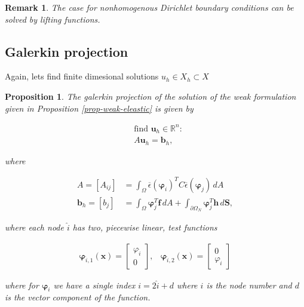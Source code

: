 \documentclass[a4paper,english]{elsarticle}%
\newtheorem{proposition}[theorem]{Proposition}
\newtheorem*{remark}{Remark}
\begin{document}
\begin{remark}
    The case for nonhomogenous Dirichlet boundary conditions can be solved by lifting functions.
\end{remark}
\subsection{Galerkin projection}
Again, lets find finite dimesional solutions $ u_h \in X_h \subset X$

\begin{proposition}
    The galerkin projection of the solution of the weak formulation given in Proposition \ref{prop-weak-eleastic} is given by

        \begin{align}
        &\text{find } \bm u_h \in \mathbb{R}^n : \\
        & A \bm u_h = \bm b_h,
        \end{align}


    where 


        \begin{align}
        A = [A_{ij}] &= \int_\Omega \overline\epsilon (\bm \varphi_i)^T C \overline \epsilon (\bm \varphi_j) \, dA \\
        \bm b_h = [b_j] &= \int_\Omega \bm \varphi_j^T \bm f \, dA + \int_{\partial \Omega_N} \bm \varphi_j^T \bm h \, d\bm S,
        \end{align}


    where each node $\hat i$ has two, piecewise linear, test functions
    
 
        \begin{align}
        \bm \varphi_{\hat i,1} (\bm x) = 
         \begin{bmatrix}
            \varphi_{\hat i}  \\
            0 
        \end{bmatrix},
        &
        \bm \varphi_{\hat i,2} (\bm x) = 
        \begin{bmatrix}
            0  \\
            \varphi_{\hat i} 
        \end{bmatrix} 
    \end{align}

    where for $\bm \varphi_i$ we have a single index $i = 2\hat i + d$ where $i$ is the node number and $d$ is the vector component of the function.
\end{proposition}
\end{document}
